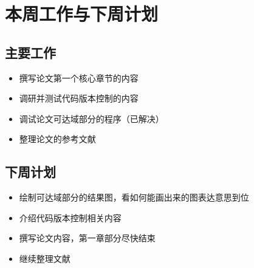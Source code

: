 \chapter{本周工作与下周计划}
\section{主要工作}
\begin{itemize}
    \item 撰写论文第一个核心章节的内容
    \item 调研并测试代码版本控制的内容
    \item 调试论文可达域部分的程序（已解决）
    \item 整理论文的参考文献
\end{itemize}
\section{下周计划}
\begin{itemize}
    \item 绘制可达域部分的结果图，看如何能画出来的图表达意思到位
    \item 介绍代码版本控制相关内容
    \item 撰写论文内容，第一章部分尽快结束
    \item 继续整理文献
\end{itemize}
